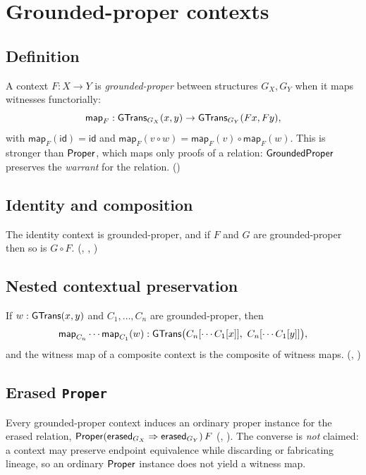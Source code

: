 \section{Grounded-proper contexts}\label{sec:contexts}

\subsection{Definition}
A context $F : X \to Y$ is \emph{grounded-proper} between structures $G_X, G_Y$ when it maps witnesses functorially:
\[
\mathsf{map}_F : \mathsf{GTrans}_{G_X}(x,y) \to \mathsf{GTrans}_{G_Y}(Fx, Fy),
\]
with $\mathsf{map}_F(\mathsf{id}) = \mathsf{id}$ and $\mathsf{map}_F(v \circ w) = \mathsf{map}_F(v) \circ \mathsf{map}_F(w)$. This is stronger than $\mathsf{Proper}$, which maps only proofs of a relation: $\mathsf{GroundedProper}$ preserves the \emph{warrant} for the relation. ()

\subsection{Identity and composition}
\begin{theorem}\label{thm:gpcomp}
The identity context is grounded-proper, and if $F$ and $G$ are grounded-proper then so is $G \circ F$. (, , )
\end{theorem}

\subsection{Nested contextual preservation}
\begin{theorem}\label{thm:ctx}
If $w : \mathsf{GTrans}(x,y)$ and $C_1,\dots,C_n$ are grounded-proper, then
\[
\mathsf{map}_{C_n}\cdots\mathsf{map}_{C_1}(w) : \mathsf{GTrans}\bigl(C_n[\cdots C_1[x]],\ C_n[\cdots C_1[y]]\bigr),
\]
and the witness map of a composite context is the composite of witness maps. (, )
\end{theorem}

\subsection{Erased \texttt{Proper}}
Every grounded-proper context induces an ordinary proper instance for the erased relation, $\mathsf{Proper}(\mathsf{erased}_{G_X} \Rightarrow \mathsf{erased}_{G_Y})\,F$ (, ). The converse is \emph{not} claimed: a context may preserve endpoint equivalence while discarding or fabricating lineage, so an ordinary $\mathsf{Proper}$ instance does not yield a witness map.

